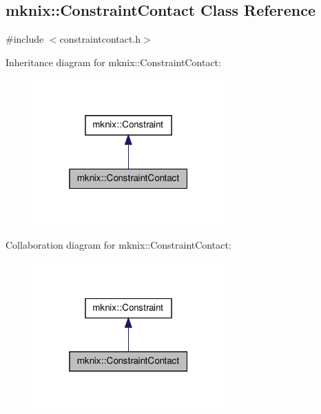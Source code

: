 \hypertarget{classmknix_1_1_constraint_contact}{\subsection{mknix\-:\-:Constraint\-Contact Class Reference}
\label{classmknix_1_1_constraint_contact}
}


{\ttfamily \#include $<$constraintcontact.\-h$>$}



Inheritance diagram for mknix\-:\-:Constraint\-Contact\-:\nopagebreak
\begin{figure}[H]
\begin{center}
\leavevmode
\includegraphics[width=208pt]{d2/d65/classmknix_1_1_constraint_contact__inherit__graph}
\end{center}
\end{figure}


Collaboration diagram for mknix\-:\-:Constraint\-Contact\-:\nopagebreak
\begin{figure}[H]
\begin{center}
\leavevmode
\includegraphics[width=208pt]{d1/d4f/classmknix_1_1_constraint_contact__coll__graph}
\end{center}
\end{figure}

